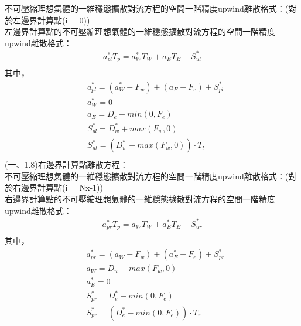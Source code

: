 \documentclass[12pt]{article}
\begin{document}
\noindent 不可壓縮理想氣體的一維穩態擴散對流方程的空間一階精度upwind離散格式：(對於左邊界計算點(i = 0))\\
左邊界計算點的不可壓縮理想氣體的一維穩態擴散對流方程的空間一階精度upwind離散格式：\\
\begin{equation}
    \begin{split}
        a_{pl}^{*}T_{p} = a_{W}^{*}T_{W} + a_{E}T_{E} + S_{ul}^{*}\\
    \end{split}
\end{equation}
\noindent 其中，
\begin{equation}
    \begin{split}
        &a_{pl}^{*} = (a_{W}^{*}-F_{w}) + (a_{E} + F_{e}) + S_{pl}^{*} \\
        &a_{W}^{*} = 0 \\
        &a_{E} = D_{e} - min(0,F_{e})\\
        &S_{pl}^{*} = D_{w}^{*} + max(F_{w},0) \\
        &S_{ul}^{*} = (D_{w}^{*} + max(F_{w},0))\cdot T_{l} \\
    \end{split}
\end{equation}
\noindent (一、1.8)右邊界計算點離散方程：\\

\noindent 不可壓縮理想氣體的一維穩態擴散對流方程的空間一階精度upwind離散格式：(對於右邊界計算點(i = Nx-1))\\
右邊界計算點的不可壓縮理想氣體的一維穩態擴散對流方程的空間一階精度upwind離散格式：\\
\begin{equation}
    \begin{split}
        a_{pr}^{*}T_{p} = a_{W}T_{W} + a_{E}^{*}T_{E} + S_{ur}^{*}\\
    \end{split}
\end{equation}
\noindent 其中，
\begin{equation}
    \begin{split}
        &a_{pr}^{*} = (a_{W}-F_{w}) + (a_{E}^{*} + F_{e}) + S_{pr}^{*} \\
        &a_{W} = D_{w} + max(F_{w},0) \\
        &a_{E}^{*} = 0 \\
        &S_{pr}^{*} = D_{e}^{*} - min(0,F_{e}) \\
        &S_{pr}^{*} = (D_{e}^{*}  - min(0 , F_{e} ))\cdot T_{r}\\
    \end{split}
\end{equation}
\end{document}
